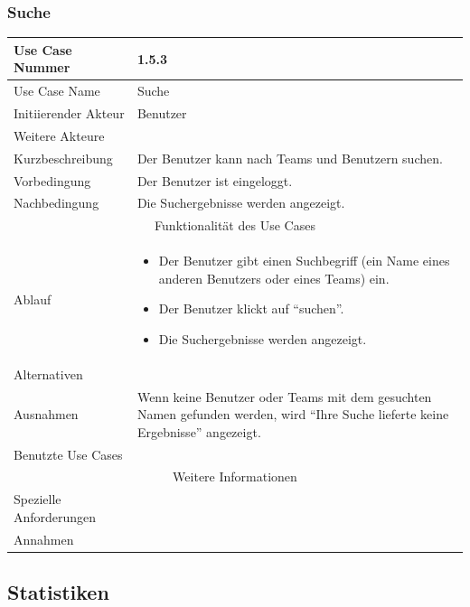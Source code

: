 \documentclass[10pt,a4paper]{article}
\begin{document}
\subsubsection{Suche}
	\begin{tabularx}{\textwidth}{|l|X|}
	\hline Use Case Nummer & 1.5.3 \\ 
	\hline Use Case Name & Suche \\ 
	\hline Initiierender Akteur & Benutzer \\
	\hline Weitere Akteure &  \\
	\hline Kurzbeschreibung & Der Benutzer kann nach Teams und Benutzern suchen. \\
	\hline Vorbedingung & Der Benutzer ist eingeloggt. \\
	\hline Nachbedingung & Die Suchergebnisse werden angezeigt. \\
	\hline \multicolumn{2}{|c|}{Funktionalität des Use Cases}\\
	\hline Ablauf & \begin{itemize}
		\item Der Benutzer gibt einen Suchbegriff (ein Name eines anderen Benutzers oder eines Teams) ein.
		\item Der Benutzer klickt auf ``suchen''.
		\item Die Suchergebnisse werden angezeigt.
	\end{itemize} \\
	\hline Alternativen &  \\
	\hline Ausnahmen & Wenn keine Benutzer oder Teams mit dem gesuchten Namen gefunden werden, wird ``Ihre Suche lieferte keine Ergebnisse'' angezeigt. \\
	\hline Benutzte Use Cases &  \\
	\hline \multicolumn{2}{|c|}{Weitere Informationen} \\
	\hline Spezielle Anforderungen &  \\
	\hline Annahmen &  \\
	\hline
	\end{tabularx}

\subsection{Statistiken}
\end{document}
